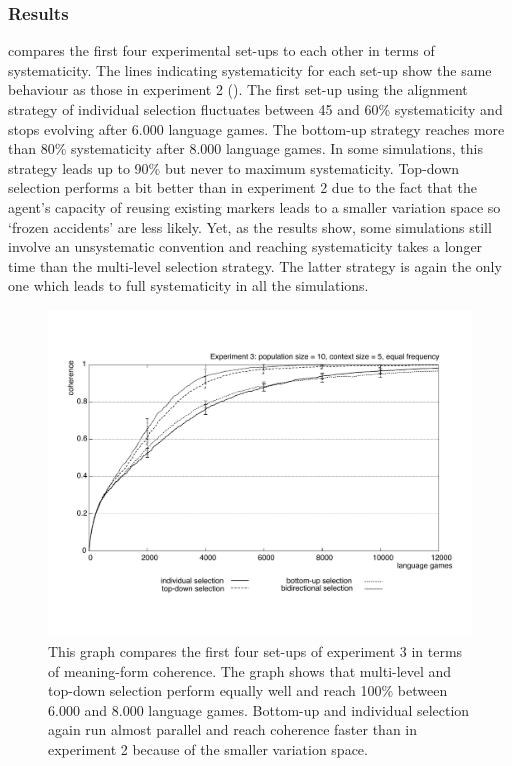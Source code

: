 \subsubsection{Results}
  compares the first four experimental set-ups to each other in terms of systematicity. The lines indicating systematicity for each set-up show the same behaviour as those in experiment 2 (). The first set-up using the alignment strategy of individual selection fluctuates between 45 and 60\% systematicity and stops evolving after 6.000 language games. The bottom-up strategy reaches more than 80\% systematicity after 8.000 language games. In some simulations, this strategy leads up to 90\% but never to maximum systematicity. Top-down selection performs a bit better than in experiment 2 due to the fact that the agent's capacity of reusing existing markers leads to a smaller variation space so `frozen accidents' are less likely. Yet, as the results show, some simulations still involve an unsystematic convention and reaching systematicity takes a longer time than the multi-level selection strategy. The latter strategy is again the only one which leads to full systematicity in all the simulations.

\begin{figure}[p]
\centerline{\includegraphics[width=\textwidth]{Chapter4/figs/coherence3}}
  \caption[Experiment 3: coherence]{This graph compares the first four set-ups of experiment 3 in terms of meaning-form coherence. The graph shows that multi-level and top-down selection perform equally well and reach 100\% between 6.000 and 8.000 language games. Bottom-up and individual selection again run almost parallel and reach coherence faster than in experiment 2 because of the smaller variation space.}
   \label{f:coherence3}
\end{figure}

